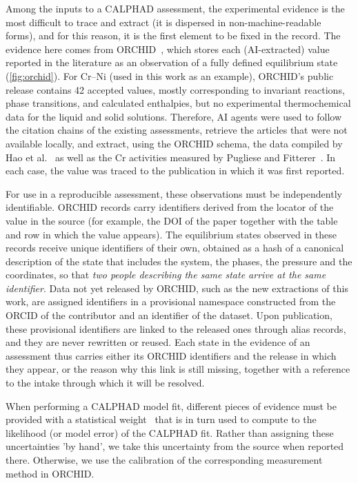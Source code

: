 Among the inputs to a CALPHAD assessment, the experimental evidence is the most difficult to trace and extract (it is dispersed in non-machine-readable forms), and for this reason, it is the first element to be fixed in the record. The evidence here comes from ORCHID~\cite{arroyave2026orchid}, which stores each (AI-extracted) value reported in the literature as an observation of a fully defined equilibrium state (\cref{fig:orchid}). For Cr--Ni (used in this work as an example), ORCHID's public release contains 42 accepted values, mostly corresponding to invariant reactions, phase transitions, and calculated enthalpies, but no experimental thermochemical data for the liquid and solid solutions. Therefore, AI agents were used to follow the citation chains of the existing assessments, retrieve the articles that were not available locally, and extract, using the ORCHID schema, the data compiled by Hao et al.~\cite{hao2021} as well as the Cr activities measured by Pugliese and Fitterer~\cite{pugliese1970}. In each case, the value was traced to the publication in which it was first reported.

For use in a reproducible assessment, these observations must be independently identifiable. ORCHID records carry identifiers derived from the locator of the value in the source (for example, the DOI of the paper together with the table and row in which the value appears). The equilibrium states observed in these records receive unique identifiers of their own, obtained as a hash of a canonical description of the state that includes the system, the phases, the pressure and the coordinates, so that \emph{two people describing the same state arrive at the same identifier}. Data not yet released by ORCHID, such as the new extractions of this work, are assigned identifiers in a provisional namespace constructed from the ORCID of the contributor and an identifier of the dataset. Upon publication, these provisional identifiers are linked to the released ones through alias records, and they are never rewritten or reused. Each state in the evidence of an assessment thus carries either its ORCHID identifiers and the release in which they appear, or the reason why this link is still missing, together with a reference to the intake through which it will be resolved.

When performing a CALPHAD model fit, different pieces of evidence must be provided with a statistical weight~\cite{bocklund2019espei} that is in turn used to compute to the likelihood (or model error) of the CALPHAD fit. Rather than assigning these uncertainties 'by hand', we take this uncertainty from the source when reported there. Otherwise, we use the calibration of the corresponding measurement method in ORCHID. 

